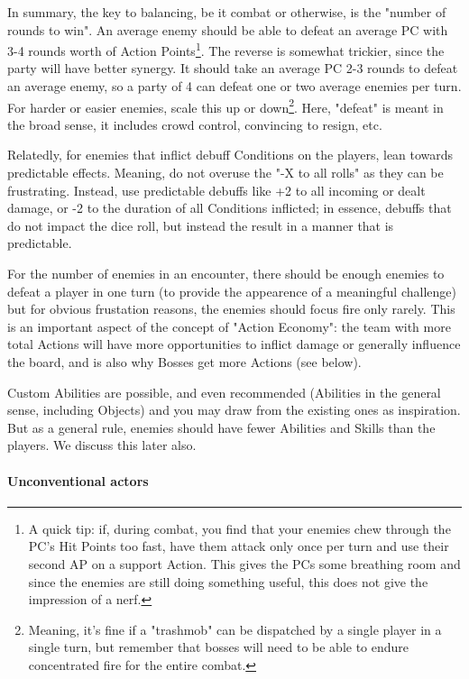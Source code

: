 In summary, the key to balancing, be it combat or otherwise, is the "number of rounds to win". An average enemy should be able to defeat an average PC with 3-4 rounds worth of Action Points\footnote{A quick tip: if, during combat, you find that your enemies chew through the PC's Hit Points too fast, have them attack only once per turn and use their second AP on a support Action. This gives the PCs some breathing room and since the enemies are still doing something useful, this does not give the impression of a nerf.}. The reverse is somewhat trickier, since the party will have better synergy. It should take an average PC 2-3 rounds to defeat an average enemy, so a party of 4 can defeat one or two average enemies per turn. For harder or easier enemies, scale this up or down\footnote{Meaning, it's fine if a "trashmob" can be dispatched by a single player in a single turn, but remember that bosses will need to be able to endure concentrated fire for the entire combat.}. Here, "defeat" is meant in the broad sense, it includes crowd control, convincing to resign, etc.

Relatedly, for enemies that inflict debuff Conditions on the players, lean towards predictable effects. Meaning, do not overuse the "-X to all rolls" as they can be frustrating. Instead, use predictable debuffs like +2 to all incoming or dealt damage, or -2 to the duration of all Conditions inflicted; in essence, debuffs that do not impact the dice roll, but instead the result in a manner that is predictable.

For the number of enemies in an encounter, there should be enough enemies to defeat a player in one turn (to provide the appearence of a meaningful challenge) but for obvious frustation reasons, the enemies should focus fire only rarely. This is an important aspect of the concept of "Action Economy": the team with more total Actions will have more opportunities to inflict damage or generally influence the board, and is also why Bosses get more Actions (see below).

Custom Abilities are possible, and even recommended (Abilities in the general sense, including Objects) and you may draw from the existing ones as inspiration. But as a general rule, enemies should have fewer Abilities and Skills than the players. We discuss this later also.

\paragraph{Unconventional actors}

